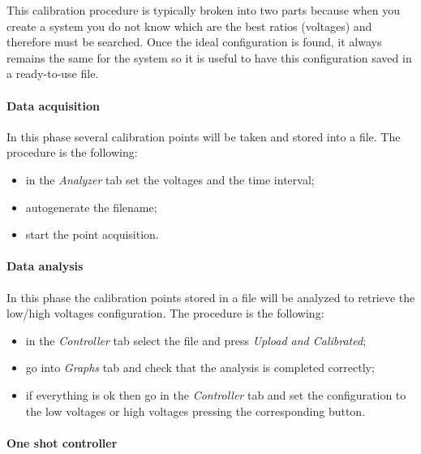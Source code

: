 This calibration procedure is typically broken into two parts because when you create a system you do not know which are the best ratios (voltages) and therefore must be searched.
Once the ideal configuration is found, it always remains the same for the system so it is useful to have this configuration saved in a ready-to-use file.

\paragraph{Data acquisition}

In this phase several calibration points will be taken and stored into a file. The procedure
is the following:

\begin{itemize}
      \itemsep1pt\parskip0pt
      \item
            in the \emph{Analyzer} tab set the voltages and the time interval;
      \item
            autogenerate the filename;
      \item
            start the point acquisition.
\end{itemize}

\paragraph{Data analysis}

In this phase the calibration points stored in a
file will be analyzed to retrieve the low/high voltages configuration. The procedure is the following:

\begin{itemize}
      \itemsep1pt\parskip0pt
      \item
            in the \emph{Controller} tab select the file and press \emph{Upload
                  and Calibrated};
      \item
            go into \emph{Graphs} tab and check that the analysis is completed
            correctly;
      \item
            if everything is ok then go in the \emph{Controller} tab and set the
            configuration to the low voltages or high voltages pressing the
            corresponding button.
\end{itemize}


\paragraph{One shot controller}

